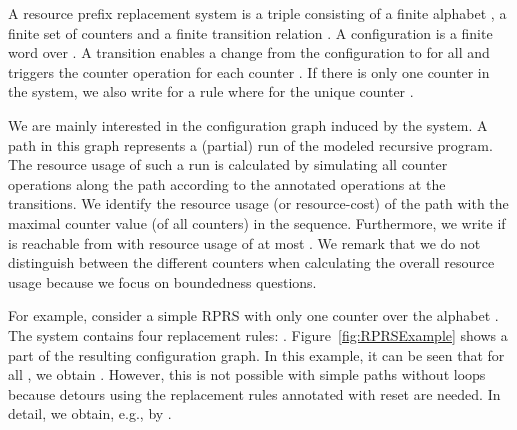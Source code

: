\documentclass{LMCS}
\newcommand{\RPRS}{\textsf{RPRS}}
\begin{document}
\begin{defi}
  A resource prefix replacement system is a triple  consisting of a finite  alphabet , a finite set
of counters  and a finite transition relation . A configuration is a finite
word over . A transition  enables a change from the
configuration  to  for all  and triggers the counter
operation  for each counter . If there is only one counter
in the system, we also write  for a rule
 where  for the unique counter .
\end{defi}

We are mainly interested in the configuration graph induced by the system. A
path in this graph represents a (partial) run of the modeled recursive program.
The resource usage of such a run is calculated by simulating all counter
operations along the path according to the annotated operations at the
transitions.  We identify the resource usage (or resource-cost) of the path with
the maximal counter value (of all counters) in the sequence. Furthermore, we
write  if  is reachable from  with resource
usage of at most . We remark that we do not distinguish between the different
counters when calculating the overall resource usage because we focus on
boundedness questions. 



For example, consider a simple \RPRS{} with only one counter  over the
alphabet . The system contains four replacement rules: . Figure~\ref{fig:RPRSExample} shows a part of the resulting configuration
graph. In this example, it can be seen that for all , we obtain . However, this is not possible with simple paths
without loops because detours using the replacement rules annotated with reset
are needed. In detail, we obtain, e.g.,  by
.
\end{document}
